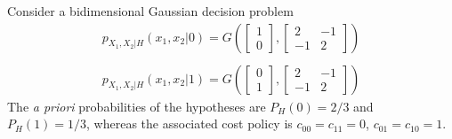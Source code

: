 \else

\question Consider a bidimensional Gaussian decision problem
  $$ \begin{array}{l} 
					   p_{X_1,X_2|H}(x_1,x_2 | 0) = G \left( \left[ \begin{array}{c}  
					   1  \\ 0  \end{array}  \right], 
					   \left[ \begin{array}{cc}  
					   2 & -1 \\ -1 & 2					   
					    \end{array}  \right] \right)\\ \\
					  p_{X_1,X_2|H}(x_1,x_2 | 1) = G \left( \left[ \begin{array}{c}  
					   0  \\ 1  \end{array}  \right], 
					   \left[ \begin{array}{cc}  
					   2 & -1 \\ -1 & 2					   
					    \end{array}  \right] \right)  
  \end{array}$$
The {\em a priori} probabilities of the hypotheses are $P_H (0) = 2/3$ and $P_H (1) = 1/3$,  whereas the associated cost policy is $c_{00}= c_{11}=0$, $c_{01}= c_{10}= 1$.

\begin{solution}
\end{solution}

\fi